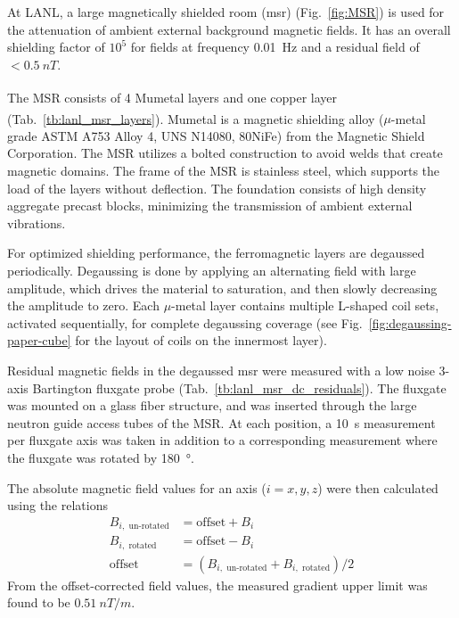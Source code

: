 At LANL, a large magnetically shielded room (\acrshort*{msr}) (Fig.~\ref{fig:MSR}) is used for the attenuation of ambient external background magnetic fields. It has an overall shielding factor of $10^5$ for fields at frequency \qty{0.01}{\hertz} and a residual field of $<\qty{0.5}{nT}$.

The MSR consists of 4 Mumetal\textsuperscript{\textregistered} layers and one copper layer (Tab.~\ref{tb:lanl_msr_layers}). Mumetal\textsuperscript{\textregistered} is a magnetic shielding alloy ($\mu$-metal grade ASTM A753 Alloy 4, UNS N14080, 80NiFe) from the Magnetic Shield Corporation. The MSR utilizes a bolted construction to avoid welds that create magnetic domains. The frame of the MSR is stainless steel, which supports the load of the layers without deflection. The foundation consists of high density aggregate precast blocks, minimizing the transmission of ambient external vibrations.

For optimized shielding performance, the ferromagnetic layers are degaussed periodically. Degaussing is done by applying an alternating field with large amplitude, which drives the material to saturation, and then slowly decreasing the amplitude to zero. Each $\mu$-metal layer contains multiple L-shaped coil sets, activated sequentially, for complete degaussing coverage (see Fig.~\ref{fig:degaussing-paper-cube} for the layout of coils on the innermost layer).


Residual magnetic fields in the degaussed \acrshort*{msr} were measured with a low noise 3-axis Bartington fluxgate probe (Tab.~\ref{tb:lanl_msr_dc_residuals}). The fluxgate was mounted on a glass fiber structure, and was inserted through the large neutron guide access tubes of the MSR. At each position, a \qty{10}{\second} measurement per fluxgate axis was taken in addition to a corresponding measurement where the fluxgate was rotated by \qty{180}{\degree}.

The absolute magnetic field values for an axis ($i=x,y,z$) were then calculated using the relations
%
\begin{align}
    B_{i,\text{ un-rotated}}&=\text{offset}+B_{i}\\
    B_{i,\text{ rotated}}&=\text{offset}-B_{i}\\
    \text{offset}&= (B_{i,\text{ un-rotated}} + B_{i,\text{ rotated}})/2
\end{align}
%
From the offset-corrected field values, the measured gradient upper limit was found to be $\qty{0.51}{nT\per m}$.

